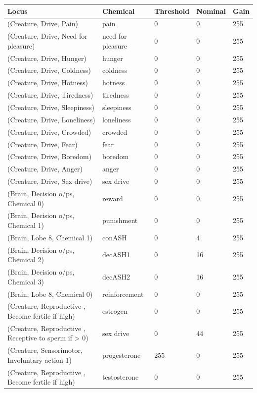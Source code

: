 \documentclass{article}
\begin{document}
\begin{longtable}{|p{7cm}|p{3cm}|p{2cm}|p{2cm}|p{2cm}|}
\hline
{\bf Locus} & {\bf Chemical} & {\bf Threshold} & {\bf Nominal} & {\bf Gain} \\ \hline
(Creature, Drive, Pain) & pain & 0 & 0 & 255 \\ \hline
(Creature, Drive, Need for pleasure) & need for pleasure & 0 & 0 & 255 \\ \hline
(Creature, Drive, Hunger) & hunger & 0 & 0 & 255 \\ \hline
(Creature, Drive, Coldness) & coldness & 0 & 0 & 255 \\ \hline
(Creature, Drive, Hotness) & hotness & 0 & 0 & 255 \\ \hline
(Creature, Drive, Tiredness) & tiredness & 0 & 0 & 255 \\ \hline
(Creature, Drive, Sleepiness) & sleepiness & 0 & 0 & 255 \\ \hline
(Creature, Drive, Loneliness) & loneliness & 0 & 0 & 255 \\ \hline
(Creature, Drive, Crowded) & crowded & 0 & 0 & 255 \\ \hline
(Creature, Drive, Fear) & fear & 0 & 0 & 255 \\ \hline
(Creature, Drive, Boredom) & boredom & 0 & 0 & 255 \\ \hline
(Creature, Drive, Anger) & anger & 0 & 0 & 255 \\ \hline
(Creature, Drive, Sex drive) & sex drive & 0 & 0 & 255 \\ \hline
(Brain, Decision o/ps, Chemical 0) & reward & 0 & 0 & 255 \\ \hline
(Brain, Decision o/ps, Chemical 1) & punishment & 0 & 0 & 255 \\ \hline
(Brain, Lobe 8, Chemical 1) & conASH & 0 & 4 & 255 \\ \hline
(Brain, Decision o/ps, Chemical 2) & decASH1 & 0 & 16 & 255 \\ \hline
(Brain, Decision o/ps, Chemical 3) & decASH2 & 0 & 16 & 255 \\ \hline
(Brain, Lobe 8, Chemical 0) & reinforcement & 0 & 0 & 255 \\ \hline
(Creature, Reproductive , Become fertile if high) & estrogen & 0 & 0 & 255 \\ \hline
(Creature, Reproductive , Receptive to sperm if > 0) & sex drive & 0 & 44 & 255 \\ \hline
(Creature, Sensorimotor, Involuntary action 1) & progesterone & 255 & 0 & 255 \\ \hline
(Creature, Reproductive , Become fertile if high) & testosterone & 0 & 0 & 255 \\ \hline

\end{longtable}
\end{document}
